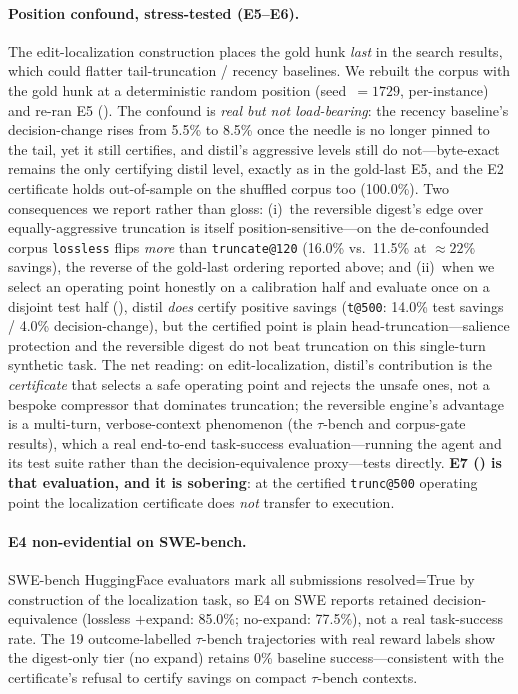 \documentclass{article}
\makeatletter
\newcommand{\OrigRecencyDC}{5.5\%}   \newcommand{\OrigRecencySav}{16.1\%}
\newcommand{\ShufRecencyDC}{8.5\%}   \newcommand{\ShufRecencySav}{15.9\%}
\newcommand{\ShufLosslessDC}{16.0\%} \newcommand{\ShufLosslessSav}{21.7\%}
\newcommand{\ShufTruncShortDC}{11.5\%} \newcommand{\ShufTruncShortSav}{22.8\%}
\newcommand{\ShufCoverage}{100.0\%}
\newcommand{\SweepPoint}{\texttt{t@500}}
\newcommand{\SweepTestSav}{14.0\%}
\newcommand{\SweepTestDC}{4.0\%}
\makeatother
\begin{document}
\paragraph{Position confound, stress-tested (E5--E6).} The edit-localization
construction places the gold hunk \emph{last} in the search results, which could
flatter tail-truncation / recency baselines. We rebuilt the corpus with the gold
hunk at a deterministic random position (seed~$=1729$, per-instance) and re-ran E5
(). The confound is \emph{real but not load-bearing}: the recency
baseline's decision-change rises from \OrigRecencyDC{} to \ShufRecencyDC{} once the
needle is no longer pinned to the tail, yet it still certifies, and distil's
aggressive levels still do not---byte-exact remains the only certifying distil level,
exactly as in the gold-last E5, and the E2 certificate holds out-of-sample on the
shuffled corpus too (\ShufCoverage{}). Two consequences we report rather than gloss:
(i)~the reversible digest's edge over equally-aggressive truncation is itself
position-sensitive---on the de-confounded corpus \texttt{lossless} flips
\emph{more} than \texttt{truncate@120} (\ShufLosslessDC{} vs.\ \ShufTruncShortDC{} at
$\approx22\%$ savings), the reverse of the gold-last ordering reported above; and
(ii)~when we select an operating point honestly on a calibration half and evaluate
once on a disjoint test half (), distil \emph{does} certify positive
savings (\SweepPoint{}: \SweepTestSav{} test savings / \SweepTestDC{} decision-change),
but the certified point is plain head-truncation---salience protection and the
reversible digest do not beat truncation on this single-turn synthetic task. The
net reading: on edit-localization, distil's contribution is the \emph{certificate}
that selects a safe operating point and rejects the unsafe ones, not a bespoke
compressor that dominates truncation; the reversible engine's advantage is a
multi-turn, verbose-context phenomenon (the $\tau$-bench and corpus-gate results),
which a real end-to-end task-success evaluation---running the agent and its test
suite rather than the decision-equivalence proxy---tests directly. \textbf{E7
() is that evaluation, and it is sobering}: at the certified
\texttt{trunc@500} operating point the localization certificate does \emph{not}
transfer to execution.

\paragraph{E4 non-evidential on SWE-bench.} SWE-bench HuggingFace evaluators mark
all submissions resolved=True by construction of the localization task, so E4 on
SWE reports retained decision-equivalence (lossless $+$expand: 85.0\%; no-expand:
77.5\%), not a real task-success rate. The 19 outcome-labelled $\tau$-bench
trajectories with real reward labels show the digest-only tier (no expand) retains
0\% baseline success---consistent with the certificate's refusal to certify savings
on compact $\tau$-bench contexts.
\end{document}
